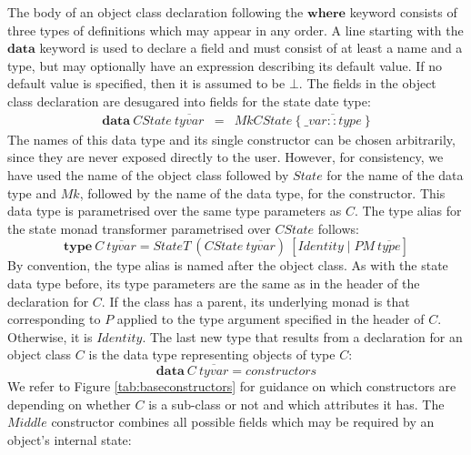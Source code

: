 \documentclass[authoryear,preprint]{sigplanconf}
\begin{document}
The body of an object class declaration following the $\mathbf{where}$ keyword consists of three types of definitions which may appear in any order. A line starting with the $\mathbf{data}$ keyword is used to declare a field and must consist of at least a name and a type, but may optionally have an expression describing its default value. If no default value is specified, then it is assumed to be $\bot$. The fields in the object class declaration are desugared into fields for the state date type: 
\begin{displaymath}
\begin{array}{lcl}
\mathbf{data}~\mathit{CState}~\overline{\mathit{tyvar}} & = & \mathit{MkCState}~\{~\overline{\_\mathit{var} :: \mathit{type}}~\}
\end{array}
\end{displaymath}
The names of this data type and its single constructor can be chosen arbitrarily, since they are never exposed directly to the user. However, for consistency, we have used the name of the object class followed by $\mathit{State}$ for the name of the data type and $\mathit{Mk}$, followed by the name of the data type, for the constructor. This data type is parametrised over the same type parameters as $C$. The type alias for the state monad transformer parametrised over $\mathit{CState}$ follows:
\begin{displaymath}
\mathbf{type}~\mathit{C}~\overline{\mathit{tyvar}} = \mathit{StateT}~(\mathit{CState}~\overline{\mathit{tyvar}})~[\mathit{Identity} \mid PM~\overline{\mathit{type}}]
\end{displaymath}
By convention, the type alias is named after the object class. As with the state data type before, its type parameters are the same as in the header of the declaration for $C$. If the class has a parent, its underlying monad is that corresponding to $P$ applied to the type argument specified in the header of $C$. Otherwise, it is $\mathit{Identity}$. The last new type that results from a declaration for an object class $C$ is the data type representing objects of type $C$:
\begin{displaymath}
\mathbf{data}~\mathit{C}~\overline{\mathit{tyvar}} = \mathit{constructors}
\end{displaymath}
We refer to Figure \ref{tab:baseconstructors} for guidance on which constructors are depending on whether $C$ is a sub-class or not and which attributes it has. The $\mathit{Middle}$ constructor combines all possible fields which may be required by an object's internal state:
\end{document}
